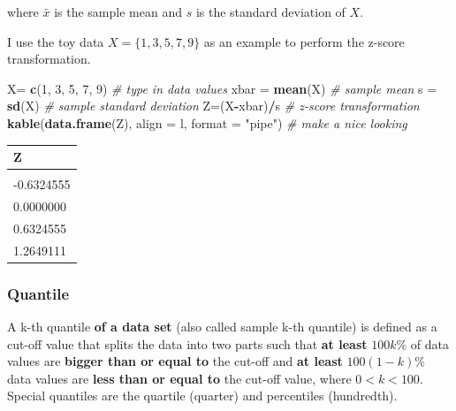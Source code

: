 \documentclass[
]{book}
\newenvironment{Shaded}{\begin{snugshade}}{\end{snugshade}}
\newcommand{\AttributeTok}[1]{\textcolor[rgb]{0.13,0.29,0.53}{#1}}
\newcommand{\CommentTok}[1]{\textcolor[rgb]{0.56,0.35,0.01}{\textit{#1}}}
\newcommand{\DecValTok}[1]{\textcolor[rgb]{0.00,0.00,0.81}{#1}}
\newcommand{\FunctionTok}[1]{\textcolor[rgb]{0.13,0.29,0.53}{\textbf{#1}}}
\newcommand{\NormalTok}[1]{#1}
\newcommand{\OtherTok}[1]{\textcolor[rgb]{0.56,0.35,0.01}{#1}}
\newcommand{\SpecialCharTok}[1]{\textcolor[rgb]{0.81,0.36,0.00}{\textbf{#1}}}
\newcommand{\StringTok}[1]{\textcolor[rgb]{0.31,0.60,0.02}{#1}}
\begin{document}
where \(\bar{x}\) is the sample mean and \(s\) is the standard deviation of \(X\).

I use the toy data \(X = \{1,3,5,7,9 \}\) as an example to perform the z-score transformation.

\begin{Shaded}
\begin{Highlighting}[]
\NormalTok{X}\OtherTok{=} \FunctionTok{c}\NormalTok{(}\DecValTok{1}\NormalTok{, }\DecValTok{3}\NormalTok{, }\DecValTok{5}\NormalTok{, }\DecValTok{7}\NormalTok{, }\DecValTok{9}\NormalTok{)     }\CommentTok{\# type in data values}
\NormalTok{xbar }\OtherTok{=} \FunctionTok{mean}\NormalTok{(X)          }\CommentTok{\# sample mean}
\NormalTok{s }\OtherTok{=} \FunctionTok{sd}\NormalTok{(X)               }\CommentTok{\# sample standard deviation}
\NormalTok{Z}\OtherTok{=}\NormalTok{(X}\SpecialCharTok{{-}}\NormalTok{xbar)}\SpecialCharTok{/}\NormalTok{s            }\CommentTok{\# z{-}score transformation}
\FunctionTok{kable}\NormalTok{(}\FunctionTok{data.frame}\NormalTok{(Z), }\AttributeTok{align =} \StringTok{\textquotesingle{}l\textquotesingle{}}\NormalTok{, }\AttributeTok{format =} \StringTok{"pipe"}\NormalTok{)   }\CommentTok{\# make a nice looking}
\end{Highlighting}
\end{Shaded}

\begin{longtable}[]{@{}l@{}}
\toprule\noalign{}
Z \\
\midrule\noalign{}
\endhead
\bottomrule\noalign{}
\endlastfoot
-1.2649111 \\
-0.6324555 \\
0.0000000 \\
0.6324555 \\
1.2649111 \\
\end{longtable}

\hypertarget{quantile}{%
\subsubsection{Quantile}\label{quantile}}

A k-th quantile \textbf{of a data set} (also called sample k-th quantile) is defined as a cut-off value that splits the data into two parts such that \textbf{at least} \(100k\%\) of data values are \textbf{bigger than or equal to} the cut-off and \textbf{at least} \(100(1-k)\%\) data values are \textbf{less than or equal to} the cut-off value, where \(0 < k < 100\). Special quantiles are the quartile (quarter) and percentiles (hundredth).
\end{document}
